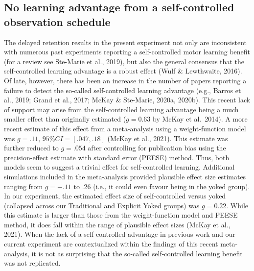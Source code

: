\documentclass[
  english,
  man,floatsintext]{apa7}
\begin{document}
\hypertarget{no-learning-advantage-from-a-self-controlled-observation-schedule}{%
\subsection{No learning advantage from a self-controlled observation schedule}\label{no-learning-advantage-from-a-self-controlled-observation-schedule}}

The delayed retention results in the present experiment not only are inconsistent with numerous past experiments reporting a self-controlled motor learning benefit (for a review see Ste-Marie et al., 2019), but also the general consensus that the self-controlled learning advantage is a robust effect (Wulf \& Lewthwaite, 2016). Of late, however, there has been an increase in the number of papers reporting a failure to detect the so-called self-controlled learning advantage (e.g., Barros et al., 2019; Grand et al., 2017; McKay \& Ste-Marie, 2020a, 2020b). This recent lack of support may arise from the self-controlled learning advantage being a much smaller effect than originally estimated (\(g = 0.63\) by McKay et al.~2014). A more recent estimate of this effect from a meta-analysis using a weight-function model was \(g = .11, \,95\% CI = [.047, .18]\) (McKay et al., 2021). This estimate was further reduced to \(g = .054\) after controlling for publication bias using the precision-effect estimate with standard error (PEESE) method. Thus, both models seem to suggest a trivial effect for self-controlled learning. Additional simulations included in the meta-analysis provided plausible effect size estimates ranging from \(g = -.11\) to \(.26\) (i.e., it could even favour being in the yoked group). In our experiment, the estimated effect size of self-controlled versus yoked (collapsed across our Traditional and Explicit Yoked groups) was \(g = 0.22\). While this estimate is larger than those from the weight-function model and PEESE method, it does fall within the range of plausible effect sizes (McKay et al., 2021). When the lack of a self-controlled advantage in previous work and our current experiment are contextualized within the findings of this recent meta-analysis, it is not as surprising that the so-called self-controlled learning benefit was not replicated.
\end{document}
